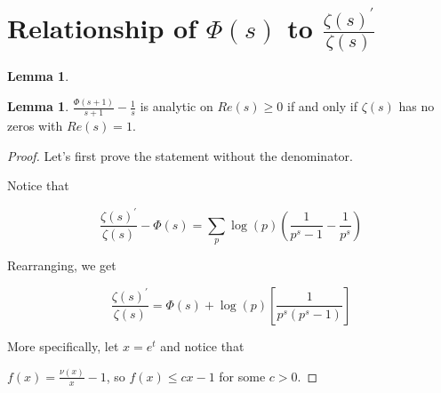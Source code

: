 \documentclass{article}
\theoremstyle{definition}
\newtheorem{lemma}[theorem]{Lemma}
\begin{document}
\section{Relationship of $ \Phi(s) $ to $ \frac{\zeta(s)^{\prime}}{\zeta(s)}$}

\begin{lemma}\label{lem:newman_v}

\end{lemma}



\begin{lemma}\label{lem:newman_v_conditions}
    $ \frac{\Phi(s + 1)}{s + 1} - \frac{1}{s} $ is analytic on 
    $ Re(s) \geq 0 $ if and only if $ \zeta(s) $ has no zeros
    with $ Re(s) = 1 $.
\end{lemma}
\begin{proof}
    Let's first prove the statement without the denominator.

    Notice that

    \[ \frac{\zeta(s)^{\prime}}{\zeta(s)} - \Phi(s) = \sum_{p} \log(p) (\frac{1}{p^{s} - 1} - \frac{1}{p^{s}}) \]
    
    Rearranging, we get
    
    \[ \frac{\zeta(s)^{\prime}}{\zeta(s)} = \Phi(s) + \log(p)[\frac{1}{p^{s}(p^{s} - 1)}] \]
    
    More specifically, let $ x = e^{t} $
    and notice that 
    
    $ f(x) = \frac{\nu(x)}{x} - 1 $, so $ f(x) \leq cx - 1 $ for some $ c > 0 $.
\end{proof}
\end{document}
